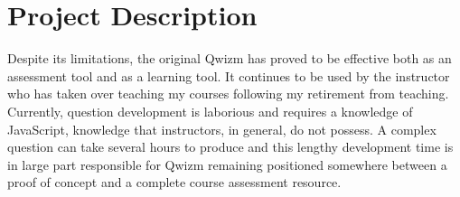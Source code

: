 \documentclass{tufte-handout}
\begin{document}
\section{\Large Project Description}\label{sec:background}

Despite its limitations, the original Qwizm has proved to be effective both as an assessment tool and as a learning tool. It continues to be used by the instructor who has taken over teaching my courses following my retirement from teaching.
\parm
Currently, question development is laborious and requires a knowledge of JavaScript, knowledge that instructors, in general, do not possess. A complex question can take several hours to produce and this lengthy development time is in large part responsible for Qwizm remaining positioned somewhere between a proof of concept and a complete course assessment resource.
\end{document}
